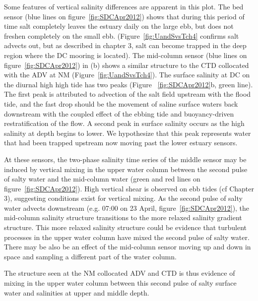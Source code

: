 Some features of vertical salinity differences are apparent in this plot. The bed sensor (blue lines on figure~\ref{fig:SDCApr2012}) shows that during this period of time salt completely leaves the estuary daily on the large ebb, but does not freshen completely on the small ebb. (Figure~\ref{fig:UandSvsTch4} confirms salt advects out, but as described in chapter 3, salt can become trapped in the deep region where the DC mooring is located). The mid-column sensor (blue lines on figure~\ref{fig:SDCApr2012}) in (b) shows a similar structure to the CTD collocated with the ADV at NM (Figure~\ref{fig:UandSvsTch4}). The surface salinity at DC on the diurnal high high tide has two peaks (Figure ~\ref{fig:SDCApr2012}b, green line). The first peak is attributed to advection of the salt field upstream with the flood tide, and the fast drop should be the movement of saline surface waters back downstream with the coupled effect of the ebbing tide and buoyancy-driven restratification of the flow. A second peak in surface salinity occurs as the high salinity at depth begins to lower. We hypothesize that this peak represents water that had been trapped upstream now moving past the lower estuary sensors. 

At these sensors, the two-phase salinity time series of the middle sensor may be induced by vertical mixing in the upper water column between the second pulse of salty water and the mid-column water (green and red lines on figure~\ref{fig:SDCApr2012}). High vertical shear is observed on ebb tides (cf Chapter 3), suggesting conditions exist for vertical mixing. As the second pulse of salty water advects downstream (e.g. 07:00 on 23 April, figure~\ref{fig:SDCApr2012}), the mid-column salinity structure transitions to the more relaxed salinity gradient structure. This more relaxed salinity structure could be evidence that turbulent processes in the upper water column have mixed the second pulse of salty water. There may be also be an effect of the mid-column sensor moving up and down in space and sampling a different part of the water column. 

The structure seen at the NM collocated ADV and CTD is thus evidence of mixing in the upper water column between this second pulse of salty surface water and salinities at upper and middle depth.

